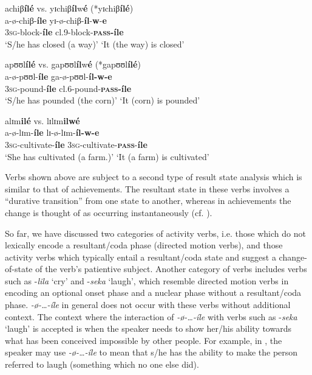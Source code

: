 \documentclass[output=paper,newtxmath,modfonts,nonflat,draftmode]{langsci/langscibook}
\begin{document}
\ex \glll achiβ\textbf{ílé}      vs.  yɪchiβ\textbf{íl}w\textbf{é} (*yɪchiβ\textbf{ílé})\\
    a-ø-chiβ-\textbf{íle}   {}   yɪ-ø-chiβ-\textbf{íl}-\textbf{w}-\textbf{e}\\
    3\textsc{sg}-block-\textbf{íle}  {}   cl.9-block-\textbf{\textsc{pass}-íle}\\
    \glt ‘S/he has closed (a way)’ {} ‘It (the way) is closed’

\ex \glll *apʊʊl\textbf{ílé}      vs.  gapʊʊl\textbf{íl}w\textbf{é} (*gapʊʊl\textbf{ílé})\\
    a-ø-pʊʊl-\textbf{íle}   {}   ga-ø-pʊʊl-\textbf{íl-w-e}\\
    3\textsc{sg}-pound-\textbf{íle}  {}    cl.6-pound-\textbf{\textsc{pass}-íle}\\
\glt     ‘S/he has pounded (the corn)’ {} ‘It (corn) is pounded’

\ex \glll *alɪm\textbf{ilé}      vs.  lɪlɪm\textbf{ilwé}\\
a-ø-lɪm-\textbf{íle}    {}    lɪ-ø-lɪm-\textbf{íl-w-e}\\
3\textsc{sg}-cultivate-\textbf{íle}  {}    3\textsc{sg}-cultivate-\textbf{\textsc{pass}}-\textbf{íle}\\
\glt ‘She has cultivated (a farm.)’ {} ‘It (a farm) is cultivated’
\z
\z

Verbs shown above are subject to a second type of result state analysis which is similar to that of achievements. The resultant state in these verbs involves a “durative transition” from one state to another, whereas in achievements the change is thought of as occurring instantaneously (cf. \citealt{Pustejovsky1991}).

So far, we have discussed two categories of activity verbs, i.e. those which do not lexically encode a resultant/coda phase (directed motion verbs), and those activity verbs which typically entail a resultant/coda state and suggest a change-of-state of the verb’s patientive subject. Another category of verbs includes verbs such as -\textit{lila} ‘cry’ and -\textit{seka} ‘laugh’, which resemble directed motion verbs in encoding an optional onset phase and a nuclear phase without a resultant/coda phase. \textit{-ø-…-íle} in general does not occur with these verbs without additional context. The context where the interaction of \textit{-ø-…-íle} with verbs such as -\textit{seka} ‘laugh’ is accepted is when the speaker needs to show her/his ability towards what has been conceived impossible by other people. For example, in , the speaker may use \textit{-ø-…-íle} to mean that s/he has the ability to make the person referred to laugh (something which no one else did). 
\end{document}
